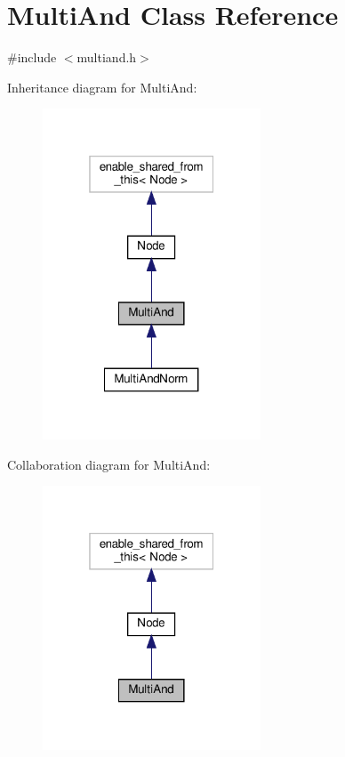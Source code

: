 \hypertarget{class_multi_and}{}\section{Multi\+And Class Reference}
\label{class_multi_and}


{\ttfamily \#include $<$multiand.\+h$>$}



Inheritance diagram for Multi\+And\+:\nopagebreak
\begin{figure}[H]
\begin{center}
\leavevmode
\includegraphics[width=184pt]{db/dd3/class_multi_and__inherit__graph}
\end{center}
\end{figure}


Collaboration diagram for Multi\+And\+:\nopagebreak
\begin{figure}[H]
\begin{center}
\leavevmode
\includegraphics[width=184pt]{d2/d92/class_multi_and__coll__graph}
\end{center}
\end{figure}
